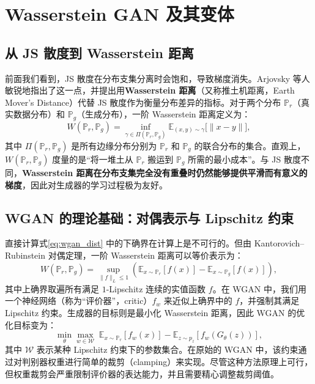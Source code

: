 \section{Wasserstein GAN 及其变体}

\subsection{从 JS 散度到 Wasserstein 距离}

前面我们看到，JS 散度在分布支集分离时会饱和，导致梯度消失。Arjovsky 等人\cite{arjovsky2017wassersteingan} 敏锐地指出了这一点，并提出用\textbf{Wasserstein 距离}（又称推土机距离，Earth Mover's Distance）代替 JS 散度作为衡量分布差异的指标。对于两个分布 $\mathbb{P}_r$（真实数据分布）和 $\mathbb{P}_g$（生成分布），一阶 Wasserstein 距离定义为：
\begin{equation}\label{eq:wgan_dist}
W(\mathbb{P}_r, \mathbb{P}_g) = \inf_{\gamma \in \Pi(\mathbb{P}_r, \mathbb{P}_g)} \mathbb{E}_{(x, y) \sim \gamma} \big[\|x - y\|\big],
\end{equation}
其中 $\Pi(\mathbb{P}_r, \mathbb{P}_g)$ 是所有边缘分布分别为 $\mathbb{P}_r$ 和 $\mathbb{P}_g$ 的联合分布的集合。直观上，$W(\mathbb{P}_r, \mathbb{P}_g)$ 度量的是“将一堆土从 $\mathbb{P}_r$ 搬运到 $\mathbb{P}_g$ 所需的最小成本”。与 JS 散度不同，\textbf{Wasserstein 距离在分布支集完全没有重叠时仍然能够提供平滑而有意义的梯度}，因此对生成器的学习过程极为友好。

\subsection{WGAN 的理论基础：对偶表示与 Lipschitz 约束}

直接计算式\eqref{eq:wgan_dist} 中的下确界在计算上是不可行的。但由 Kantorovich–Rubinstein 对偶定理，一阶 Wasserstein 距离可以等价表示为：
\begin{equation}\label{eq:wgan_dual}
W(\mathbb{P}_r, \mathbb{P}_g) = \sup_{\|f\|_L \le 1} \left( \mathbb{E}_{x \sim \mathbb{P}_r}[f(x)] - \mathbb{E}_{x \sim \mathbb{P}_g}[f(x)] \right),
\end{equation}
其中上确界取遍所有满足 $1$-Lipschitz 连续的实值函数 $f$。在 WGAN 中，我们用一个神经网络（称为“评价器”，critic）$f_w$ 来近似上确界中的 $f$，并强制其满足 Lipschitz 约束。生成器的目标则是最小化 Wasserstein 距离，因此 WGAN 的优化目标变为：
\[
\min_{\theta} \max_{w \in \mathcal{W}} \; \mathbb{E}_{x \sim \mathbb{P}_r}[f_w(x)] - \mathbb{E}_{z \sim p_z}[f_w(G_{\theta}(z))],
\]
其中 $\mathcal{W}$ 表示某种 Lipschitz 约束下的参数集合。在原始的 WGAN 中，该约束通过对判别器权重进行简单的裁剪（clamping）来实现\cite{arjovsky2017wassersteingan}。尽管这种方法原理上可行，但权重裁剪会严重限制评价器的表达能力，并且需要精心调整裁剪阈值。

